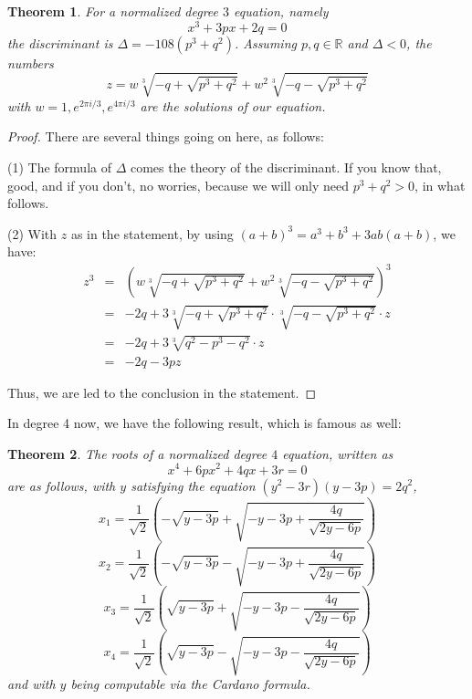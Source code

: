 \documentclass[12pt]{amsbook}
\newtheorem{theorem}{Theorem}[chapter]
\begin{document}
\begin{theorem}
For a normalized degree $3$ equation, namely 
$$x^3+3px+2q=0$$
the discriminant is $\Delta=-108(p^3+q^2)$. Assuming $p,q\in\mathbb R$ and $\Delta<0$, the numbers
$$z=w\sqrt[3]{-q+\sqrt{p^3+q^2}}+w^2\sqrt[3]{-q-\sqrt{p^3+q^2}}$$
with $w=1,e^{2\pi i/3},e^{4\pi i/3}$ are the solutions of our equation.
\end{theorem}

\begin{proof}
There are several things going on here, as follows:

\medskip

(1) The formula of $\Delta$ comes the theory of the discriminant. If you know that, good, and if you don't, no worries, because we will only need $p^3+q^2>0$, in what follows. 

\medskip

(2) With $z$ as in the statement, by using $(a+b)^3=a^3+b^3+3ab(a+b)$, we have:
\begin{eqnarray*}
z^3
&=&\left(w\sqrt[3]{-q+\sqrt{p^3+q^2}}+w^2\sqrt[3]{-q-\sqrt{p^3+q^2}}\right)^3\\
&=&-2q+3\sqrt[3]{-q+\sqrt{p^3+q^2}}\cdot\sqrt[3]{-q-\sqrt{p^3+q^2}}\cdot z\\
&=&-2q+3\sqrt[3]{q^2-p^3-q^2}\cdot z\\
&=&-2q-3pz
\end{eqnarray*}

Thus, we are led to the conclusion in the statement.
\end{proof}

In degree 4 now, we have the following result, which is famous as well:


\begin{theorem}
The roots of a normalized degree $4$ equation, written as
$$x^4+6px^2+4qx+3r=0$$ 
are as follows, with $y$ satisfying the equation $(y^2-3r)(y-3p)=2q^2$,
$$x_1=\frac{1}{\sqrt{2}}\left(-\sqrt{y-3p}+\sqrt{-y-3p+\frac{4q}{\sqrt{2y-6p}}}\right)$$
$$x_2=\frac{1}{\sqrt{2}}\left(-\sqrt{y-3p}-\sqrt{-y-3p+\frac{4q}{\sqrt{2y-6p}}}\right)$$
$$x_3=\frac{1}{\sqrt{2}}\left(\sqrt{y-3p}+\sqrt{-y-3p-\frac{4q}{\sqrt{2y-6p}}}\right)$$
$$x_4=\frac{1}{\sqrt{2}}\left(\sqrt{y-3p}-\sqrt{-y-3p-\frac{4q}{\sqrt{2y-6p}}}\right)$$
and with $y$ being computable via the Cardano formula.
\end{theorem}
\end{document}
